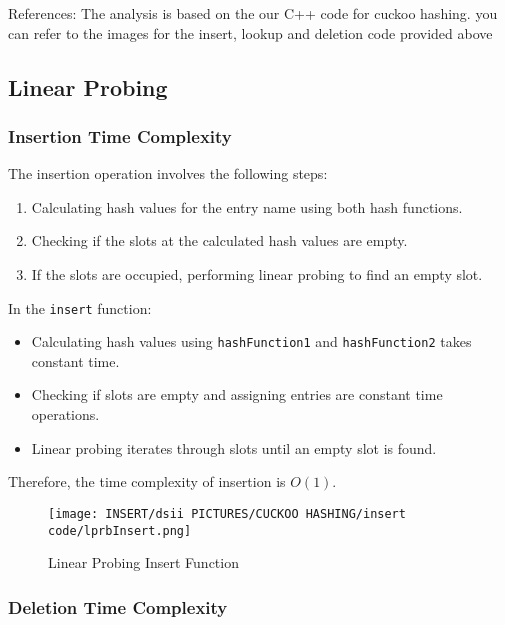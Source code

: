 \documentclass[12pt]{article}
\begin{document}
References: The analysis is based on the our C++ code for cuckoo hashing. you can refer to the images for the insert, lookup and deletion code provided above



\newpage
\subsection{Linear Probing}

\subsubsection{Insertion Time Complexity}

The insertion operation involves the following steps:
\begin{enumerate}
    \item Calculating hash values for the entry name using both hash functions.
    \item Checking if the slots at the calculated hash values are empty.
    \item If the slots are occupied, performing linear probing to find an empty slot.
\end{enumerate}

In the \texttt{insert} function:
\begin{itemize}
    \item Calculating hash values using \texttt{hashFunction1} and \texttt{hashFunction2} takes constant time.
    \item Checking if slots are empty and assigning entries are constant time operations.
    \item Linear probing iterates through slots until an empty slot is found.
\end{itemize}

Therefore, the time complexity of insertion is $O(1)$.

\begin{figure}[htbp]
    \centering
    \texttt{[image: INSERT/dsii PICTURES/CUCKOO HASHING/insert code/lprbInsert.png]}
    \caption{Linear Probing Insert Function}
    \label{fig:linear_insertion}
\end{figure}

\newpage

\subsubsection{Deletion Time Complexity}
\end{document}
